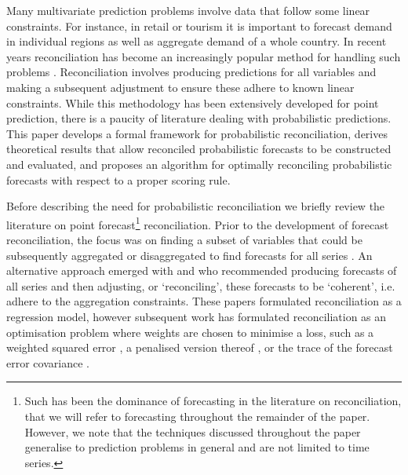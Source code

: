 \documentclass[11pt]{article}
\theoremstyle{definition}
\begin{document}
Many multivariate prediction problems involve data that follow some linear constraints. For instance, in retail or tourism it is important to forecast demand in individual regions as well as aggregate demand of a whole country. In recent years reconciliation has become an increasingly popular method for handling such problems \citep[see][for an overview]{FPP2018}. Reconciliation involves producing predictions for all variables and making a subsequent adjustment to ensure these adhere to known linear constraints. While this methodology has been extensively developed for point prediction, there is a paucity of literature dealing with probabilistic predictions. This paper develops a formal framework for probabilistic reconciliation, derives theoretical results that allow reconciled probabilistic forecasts to be constructed and evaluated, and proposes an algorithm for optimally reconciling probabilistic forecasts with respect to a proper scoring rule.

Before describing the need for probabilistic reconciliation we briefly review the literature on point forecast\footnote{Such has been the dominance of forecasting in the literature on reconciliation, that we will refer to forecasting throughout the remainder of the paper. However, we note that the techniques discussed throughout the paper generalise to prediction problems in general and are not limited to time series.} reconciliation. Prior to the development of forecast reconciliation, the focus was on finding a subset of variables that could be subsequently aggregated or disaggregated to find forecasts for all series \citep[see][and references therein]{Dunn1976,Gross1990}. An alternative approach emerged with \cite{AthEtAl2009} and \cite{HynEtAl2011} who recommended producing forecasts of all series and then adjusting, or `reconciling', these forecasts to be `coherent', i.e. adhere to the aggregation constraints. These papers formulated reconciliation as a regression model, however subsequent work has formulated reconciliation as an optimisation problem where weights are chosen to minimise a loss, such as a weighted squared error \citep{VanErven2015a,nystrup2020}, a penalised version thereof \citep{bentaiebkoo}, or the trace of the forecast error covariance \citep{WicEtAl2019}.
\end{document}
